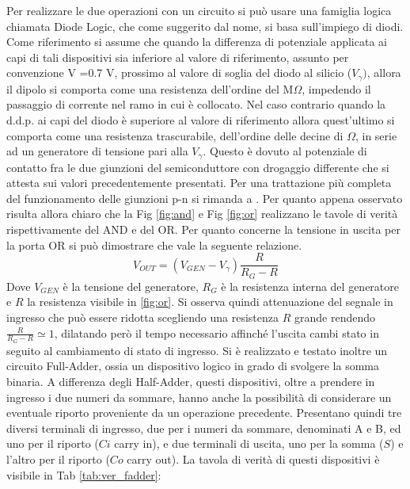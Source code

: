 \documentclass[a4paper,11pt]{article}
\begin{document}
	Per realizzare le due operazioni con un circuito si può usare una famiglia logica chiamata Diode Logic, che come suggerito dal nome, si basa sull'impiego di diodi. Come riferimento si assume che quando la differenza di potenziale applicata ai capi di tali dispositivi sia inferiore al valore di riferimento, assunto per convenzione V =0.7 V, prossimo al valore di soglia del diodo al silicio ($V_\gamma)$, allora   il dipolo si comporta come una resistenza dell'ordine del M$\Omega$, impedendo il passaggio di corrente nel ramo in cui è collocato. Nel caso contrario quando la d.d.p. ai capi del diodo è superiore al valore di riferimento allora quest'ultimo si comporta come una resistenza trascurabile, dell'ordine delle decine di $\Omega$, in serie ad un generatore di tensione pari alla $V_\gamma$. Questo è dovuto al potenziale di contatto fra le due giunzioni del semiconduttore con drogaggio differente che si attesta sui valori precedentemente presentati. Per una trattazione più completa del funzionamento delle giunzioni p-n si rimanda a \cite{6773080}. Per quanto appena osservato risulta allora chiaro che la Fig \ref{fig:and} e Fig \ref{fig:or} realizzano le tavole di verità rispettivamente del AND e del OR.
	Per quanto concerne la tensione in uscita per la porta OR si può dimostrare che vale la seguente relazione.
	\begin{equation}
		V_{OUT} = (V_{GEN}- V_\gamma) \frac{R}{R_G-R}
		\label{eq:v_out}
	\end{equation}
	Dove $V_{GEN}$ è la tensione del generatore, $R_G$ è la resistenza interna del generatore e $R$ la resistenza visibile in \ref{fig:or}. Si osserva quindi attenuazione del segnale in ingresso che può essere ridotta scegliendo una resistenza $R$ grande rendendo $\frac{R}{R_G-R} \simeq1$, dilatando però il tempo necessario affinché l'uscita cambi stato in seguito al cambiamento di stato di ingresso.
	Si è realizzato e testato inoltre un circuito Full-Adder, ossia un dispositivo logico in grado di svolgere la somma binaria. A differenza degli Half-Adder, questi dispositivi, oltre a prendere in ingresso i due numeri da sommare, hanno anche la possibilità di considerare un eventuale riporto proveniente da un operazione precedente. Presentano quindi tre diversi terminali di ingresso, due per i numeri da sommare, denominati A e B, ed uno per il riporto ($Ci$ carry in), e due terminali di uscita, uno per la somma ($S$) e l'altro per il riporto ($Co$ carry out). La tavola di verità di questi dispositivi è visibile in Tab \ref{tab:ver_fadder}:
\end{document}
